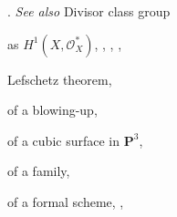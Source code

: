 {{\noindent\hspace*{15.0bp}. \emph{See also} Divisor class group\par
\noindent\hspace*{7.5bp}as $H^1(X,\mathcal O_X^*)$, , , , \par
\noindent\hspace*{7.5bp}Lefschetz theorem, \par
\noindent\hspace*{7.5bp}of a blowing-up, \par
\noindent\hspace*{7.5bp}of a cubic surface in $\mathbf P^3$, \par
\noindent\hspace*{7.5bp}of a family, \par
\noindent\hspace*{7.5bp}of a formal scheme, , \par
}
}
